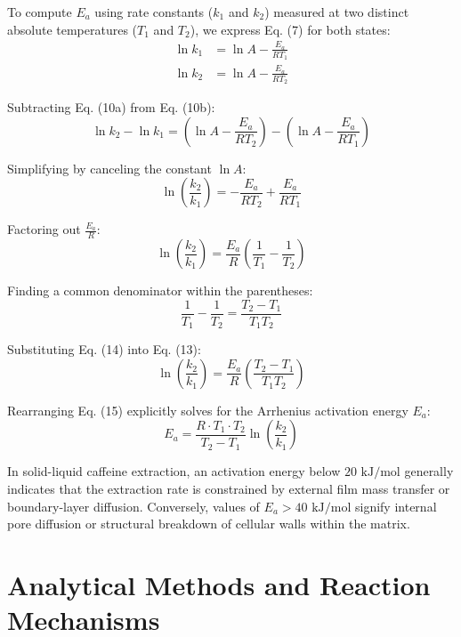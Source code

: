 \documentclass[11pt,a4paper]{article}
\begin{document}
To compute $E_a$ using rate constants ($k_1$ and $k_2$) measured at two distinct absolute temperatures ($T_1$ and $T_2$), we express Eq. (7) for both states:
\begin{align}
\ln k_1 &= \ln A - \frac{E_a}{R T_1} \tag{10a} \\
\ln k_2 &= \ln A - \frac{E_a}{R T_2} \tag{10b}
\end{align}

Subtracting Eq. (10a) from Eq. (10b):
\begin{equation}
\ln k_2 - \ln k_1 = \left(\ln A - \frac{E_a}{R T_2}\right) - \left(\ln A - \frac{E_a}{R T_1}\right)
\end{equation}

Simplifying by canceling the constant $\ln A$:
\begin{equation}
\ln\left(\frac{k_2}{k_1}\right) = -\frac{E_a}{R T_2} + \frac{E_a}{R T_1}
\end{equation}

Factoring out $\frac{E_a}{R}$:
\begin{equation}
\ln\left(\frac{k_2}{k_1}\right) = \frac{E_a}{R} \left( \frac{1}{T_1} - \frac{1}{T_2} \right)
\end{equation}

Finding a common denominator within the parentheses:
\begin{equation}
\frac{1}{T_1} - \frac{1}{T_2} = \frac{T_2 - T_1}{T_1 T_2}
\end{equation}

Substituting Eq. (14) into Eq. (13):
\begin{equation}
\ln\left(\frac{k_2}{k_1}\right) = \frac{E_a}{R} \left( \frac{T_2 - T_1}{T_1 T_2} \right)
\end{equation}

Rearranging Eq. (15) explicitly solves for the Arrhenius activation energy $E_a$:
\begin{equation}
E_a = \frac{R \cdot T_1 \cdot T_2}{T_2 - T_1} \ln\left(\frac{k_2}{k_1}\right)
\end{equation}

In solid-liquid caffeine extraction, an activation energy below $20 \text{ kJ/mol}$ generally indicates that the extraction rate is constrained by external film mass transfer or boundary-layer diffusion. Conversely, values of $E_a > 40 \text{ kJ/mol}$ signify internal pore diffusion or structural breakdown of cellular walls within the matrix.

\section{Analytical Methods and Reaction Mechanisms}
\end{document}
